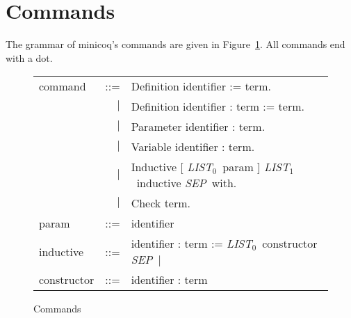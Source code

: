 \documentclass{article}
\newcommand{\minicoq}{\textsf{minicoq}}
\newcommand{\terminal}[1]{\textsf{#1}}
\newcommand{\listzero}{\textit{LIST$_0$}}
\newcommand{\listun}{\textit{LIST$_1$}}
\newcommand{\sep}{\textit{SEP}}
\begin{document}
\section{Commands}
The grammar of \minicoq's commands are given in
Figure~\ref{fig:commands}. All commands end with a dot.

\begin{figure}[htbp]
  \hrulefill
  \begin{center}
    \begin{tabular}{lrl}
      command & ::= & \terminal{Definition} identifier \terminal{:=} term. \\
              & $|$ & \terminal{Definition} identifier \terminal{:} term
                      \terminal{:=} term. \\
              & $|$ & \terminal{Parameter} identifier \terminal{:} term. \\
              & $|$ & \terminal{Variable} identifier \terminal{:} term. \\
              & $|$ & \terminal{Inductive} \terminal{[} \listzero\ param 
                      \terminal{]} \listun\ inductive \sep\ 
                      \terminal{with}. \\
              & $|$ & \terminal{Check} term. 
      \\[1em]
      param   & ::= & identifier 
      \\[1em]
      inductive & ::= & identifier \terminal{:} term \terminal{:=}
                        \listzero\ constructor \sep\ \terminal{$|$}
      \\[1em]
      constructor & ::= & identifier \terminal{:} term
    \end{tabular}
  \end{center}
  \hrulefill
  \caption{Commands}
  \label{fig:commands}
\end{figure}
\end{document}
